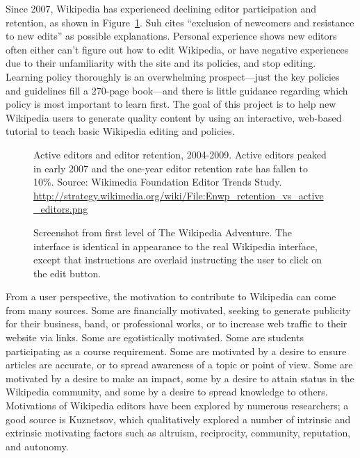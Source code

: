 \documentclass{acm_proc_article-sp}
\begin{document}
Since 2007, Wikipedia has experienced declining editor participation and retention, as shown in Figure~\ref{fig:retention}. Suh\cite{Suh:2009} cites ``exclusion of newcomers and resistance to new edits'' as possible explanations. Personal experience shows new editors often either can't figure out how to edit Wikipedia, or have negative experiences due to their unfamiliarity with the site and its policies, and stop editing. Learning policy thoroughly is an overwhelming prospect---just the key policies and guidelines fill a 270-page book---and there is little guidance regarding which policy is most important to learn first. The goal of this project is to help new Wikipedia users to generate quality content by using an interactive, web-based tutorial to teach basic Wikipedia editing and policies.

\begin{figure}
\centering
{}
\caption{Active editors and editor retention, 2004-2009. Active editors peaked in early 2007 and the one-year editor retention rate has fallen to 10\%. Source: Wikimedia Foundation Editor Trends Study.  
\url{http://strategy.wikimedia.org/wiki/File:Enwp_retention_vs_active_editors.png}}
\label{fig:retention}
\end{figure}

\begin{figure*}
\centering
{}
\caption{Screenshot from first level of The Wikipedia Adventure. The interface is identical in appearance to the real Wikipedia interface, except that instructions are overlaid instructing the user to click on the edit button. }
\label{fig:screenshot}
\end{figure*}

From a user perspective, the motivation to contribute to Wikipedia can come from many sources. Some are financially motivated, seeking to generate publicity for their business, band, or professional works, or to increase web traffic to their website via links. Some are egotistically motivated. Some are students participating as a course requirement. Some are motivated by a desire to ensure articles are accurate, or to spread awareness of a topic or point of view. Some are motivated by a desire to make an impact, some by a desire to attain status in the Wikipedia community, and some by a desire to spread knowledge to others. Motivations of Wikipedia editors have been explored by numerous researchers; a good source is Kuznetsov,\cite{Kuznetsov:2006} which qualitatively explored a number of intrinsic and extrinsic motivating factors such as altruism, reciprocity, community, reputation, and autonomy.
\end{document}
